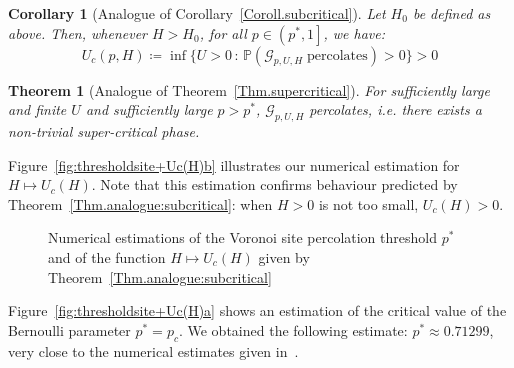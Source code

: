 \documentclass[10pt,a4paper]{amsart}
\theoremstyle{exampstyle}
\newtheorem{Theorem}{Theorem}
\newtheorem{Corollary}{Corollary}
\theoremstyle{exampnotations}
\begin{document}
\begin{Corollary}[Analogue of Corollary~\ref{Coroll.subcritical}]
\label{Coroll.analogue:subcritical}
Let $H_0$ be defined as above. Then, whenever $H > H_0$, for all $p \in \left(p^*,1\right]$, we have:
\begin{equation*}
   U_c(p,H) \coloneqq \inf \lbrace U > 0 \, : \, \mathbb{P}(\mathcal{G}_{p, U, H} \; \text{percolates}) > 0 \rbrace > 0
\end{equation*}
\end{Corollary}
\begin{Theorem}[Analogue of Theorem~\ref{Thm.supercritical}]
\label{Thm.analogue:supercritical}
For sufficiently large and finite $U$ and sufficiently large $p>p^*$, $\mathcal{G}_{p,U,H}$ percolates, i.e. there exists a non-trivial super-critical phase.
\end{Theorem}
Figure~\ref{fig:thresholdsite+Uc(H)b} illustrates our numerical estimation for $H \mapsto U_c(H)$. Note that this estimation confirms behaviour predicted by Theorem~\ref{Thm.analogue:subcritical}: when $H>0$ is not too small, $U_c(H)>0$. 
\begin{figure}[h!]
\centering
\setlength{\lineskip}{\medskipamount}
\hfill
{}\hfill
\caption{Numerical estimations of the Voronoi site percolation threshold $p^*$ and of the function $H \mapsto U_c(H)$ given by Theorem~\ref{Thm.analogue:subcritical}} \label{fig:thresholdsite+Uc(H)}
\end{figure}
Figure~\ref{fig:thresholdsite+Uc(H)a} shows an estimation of the critical value of the Bernoulli parameter $p^*=p_c$. We obtained the following estimate: $p^* \approx 0.71299$, very close to the numerical estimates given in~\cite{becker_percolation_2009,neher2008topological}. \\
\end{document}

